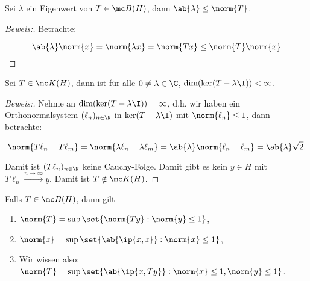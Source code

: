 \begin{theorem}
	
	Sei $\lambda$ ein Eigenwert von $T \in \mc B(H)$, dann $\ab{\lambda} \leq \norm{T}$.
	\label{norm_eigenwert}
	\begin{proof}[Beweis:]
		
		Betrachte:
		
		\[ \ab{\lambda} \norm{x} = \norm{\lambda x} = \norm{Tx} \leq \norm{T} \norm{x} \]
		
	\end{proof}
	
\end{theorem}


\begin{theorem}
	
	Sei $T \in \mc K(H)$, dann ist für alle $0 \not= \lambda \in \C$, $\text{dim}(\ker(T - \lambda \I)) < \infty$.
	
	\begin{proof}[Beweis:]
		
		Nehme an $\text{dim}(\ker(T - \lambda \I)) = \infty$, d.h. wir haben ein Orthonormalsystem $(\ell_n)_{n \in \N}$ in $\ker(T - \lambda\I)$ mit $\norm{\ell_n} \leq 1$, dann betrachte:
		
		\[ \norm{T\ell_n - T\ell_m} = \norm{\lambda\ell_n - \lambda \ell_m} = \ab{\lambda} \norm{\ell_n - \ell_m} = \ab{\lambda}\sqrt{2}. \]
		
		Damit ist $(T \ell_n)_{n \in \N}$ keine Cauchy-Folge. Damit gibt es kein $y \in H$ mit $T \ell_n \xrightarrow{n \to \infty} y$. Damit ist $T \notin \mc K(H)$.
		
	\end{proof}
	
\end{theorem}


\begin{rem}
	
	Falls $T \in \mc B(H)$, dann gilt
	
	\begin{enumerate}
		
		\item $\norm{T} = \sup{\set{\norm{Ty}:\norm{y} \leq 1}}$,
		
		\item $\norm{z} = \sup{\set{\ab{\ip{x, z}}: \norm{x} \leq 1}}$,
		
		\item Wir wissen also: $\norm{T} = \sup{\set{\ab{\ip{x, Ty}}: \norm{x} \leq 1, \norm{y} \leq 1}}$.
		
	\end{enumerate}
	
\end{rem}


